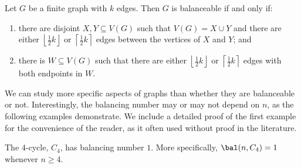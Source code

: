 \begin{theorem}\label{thm:bal_char}
    Let $G$ be a finite graph with $k$ edges.
    Then $G$ is balanceable if and only if:
    \begin{enumerate}
        \item there are disjoint $X,Y\subseteq V(G)$ such that $V(G)=X\cup Y$ and there are either $\left\lfloor\frac12k\right\rfloor$ or $\left\lceil\frac12k\right\rceil$ edges between the vertices of $X$ and $Y$; and
        
        \item there is $W\subseteq V(G)$ such that there are either $\left\lfloor\frac12k\right\rfloor$ or $\left\lceil\frac12k\right\rceil$ edges with both endpoints in $W$.
    \end{enumerate}
\end{theorem}

We can study more specific aspects of graphs than whether they are balanceable or not.
Interestingly, the balancing number may or may not depend on $n$, as the following examples demonstrate.
We include a detailed proof of the first example for the convenience of the reader, as it often used without proof in the literature.

\begin{proposition}\label{prop:balC_4_is_one}
    The $4$-cycle, $C_4$, has balancing number $1$.
    More specifically, $\bal(n,C_4)=1$ whenever $n\geq4$.
\end{proposition}

